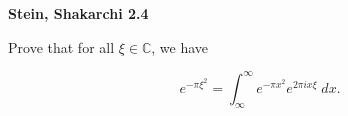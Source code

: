 \textbf{Stein, Shakarchi 2.4}

Prove that for all $\xi \in \mathbb{C}$, we have

$$
e^{-\pi \xi^2} = \int_{\infty}^{\infty} {e^{-\pi x^2} e^{2 \pi i x \xi} \; dx}.
$$

\begin{solution}
    \ \\
\end{solution}
